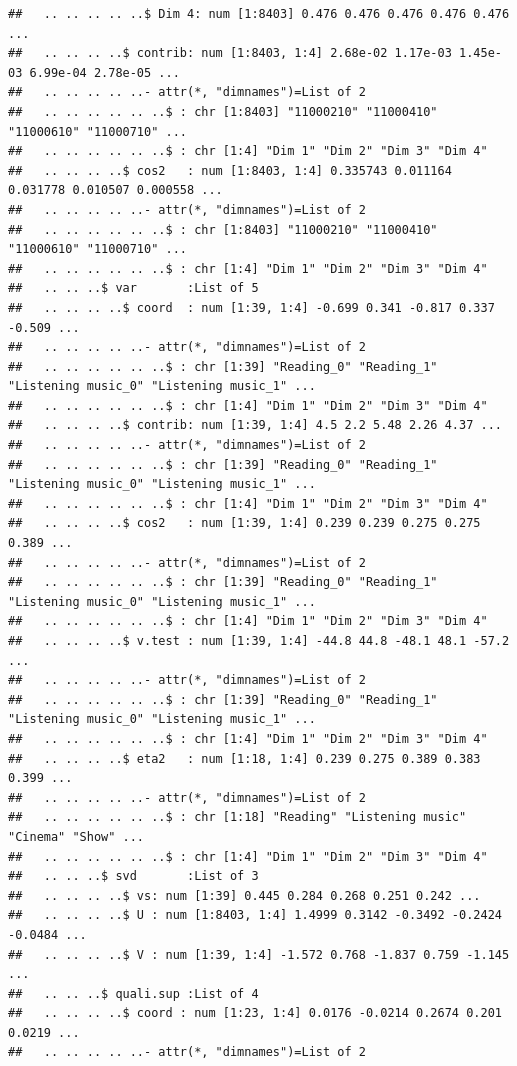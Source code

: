 \documentclass[]{book}
\begin{document}
\begin{verbatim}
##   .. .. .. .. ..$ Dim 4: num [1:8403] 0.476 0.476 0.476 0.476 0.476 ...
##   .. .. .. ..$ contrib: num [1:8403, 1:4] 2.68e-02 1.17e-03 1.45e-03 6.99e-04 2.78e-05 ...
##   .. .. .. .. ..- attr(*, "dimnames")=List of 2
##   .. .. .. .. .. ..$ : chr [1:8403] "11000210" "11000410" "11000610" "11000710" ...
##   .. .. .. .. .. ..$ : chr [1:4] "Dim 1" "Dim 2" "Dim 3" "Dim 4"
##   .. .. .. ..$ cos2   : num [1:8403, 1:4] 0.335743 0.011164 0.031778 0.010507 0.000558 ...
##   .. .. .. .. ..- attr(*, "dimnames")=List of 2
##   .. .. .. .. .. ..$ : chr [1:8403] "11000210" "11000410" "11000610" "11000710" ...
##   .. .. .. .. .. ..$ : chr [1:4] "Dim 1" "Dim 2" "Dim 3" "Dim 4"
##   .. .. ..$ var       :List of 5
##   .. .. .. ..$ coord  : num [1:39, 1:4] -0.699 0.341 -0.817 0.337 -0.509 ...
##   .. .. .. .. ..- attr(*, "dimnames")=List of 2
##   .. .. .. .. .. ..$ : chr [1:39] "Reading_0" "Reading_1" "Listening music_0" "Listening music_1" ...
##   .. .. .. .. .. ..$ : chr [1:4] "Dim 1" "Dim 2" "Dim 3" "Dim 4"
##   .. .. .. ..$ contrib: num [1:39, 1:4] 4.5 2.2 5.48 2.26 4.37 ...
##   .. .. .. .. ..- attr(*, "dimnames")=List of 2
##   .. .. .. .. .. ..$ : chr [1:39] "Reading_0" "Reading_1" "Listening music_0" "Listening music_1" ...
##   .. .. .. .. .. ..$ : chr [1:4] "Dim 1" "Dim 2" "Dim 3" "Dim 4"
##   .. .. .. ..$ cos2   : num [1:39, 1:4] 0.239 0.239 0.275 0.275 0.389 ...
##   .. .. .. .. ..- attr(*, "dimnames")=List of 2
##   .. .. .. .. .. ..$ : chr [1:39] "Reading_0" "Reading_1" "Listening music_0" "Listening music_1" ...
##   .. .. .. .. .. ..$ : chr [1:4] "Dim 1" "Dim 2" "Dim 3" "Dim 4"
##   .. .. .. ..$ v.test : num [1:39, 1:4] -44.8 44.8 -48.1 48.1 -57.2 ...
##   .. .. .. .. ..- attr(*, "dimnames")=List of 2
##   .. .. .. .. .. ..$ : chr [1:39] "Reading_0" "Reading_1" "Listening music_0" "Listening music_1" ...
##   .. .. .. .. .. ..$ : chr [1:4] "Dim 1" "Dim 2" "Dim 3" "Dim 4"
##   .. .. .. ..$ eta2   : num [1:18, 1:4] 0.239 0.275 0.389 0.383 0.399 ...
##   .. .. .. .. ..- attr(*, "dimnames")=List of 2
##   .. .. .. .. .. ..$ : chr [1:18] "Reading" "Listening music" "Cinema" "Show" ...
##   .. .. .. .. .. ..$ : chr [1:4] "Dim 1" "Dim 2" "Dim 3" "Dim 4"
##   .. .. ..$ svd       :List of 3
##   .. .. .. ..$ vs: num [1:39] 0.445 0.284 0.268 0.251 0.242 ...
##   .. .. .. ..$ U : num [1:8403, 1:4] 1.4999 0.3142 -0.3492 -0.2424 -0.0484 ...
##   .. .. .. ..$ V : num [1:39, 1:4] -1.572 0.768 -1.837 0.759 -1.145 ...
##   .. .. ..$ quali.sup :List of 4
##   .. .. .. ..$ coord : num [1:23, 1:4] 0.0176 -0.0214 0.2674 0.201 0.0219 ...
##   .. .. .. .. ..- attr(*, "dimnames")=List of 2

\end{verbatim}
\end{document}
